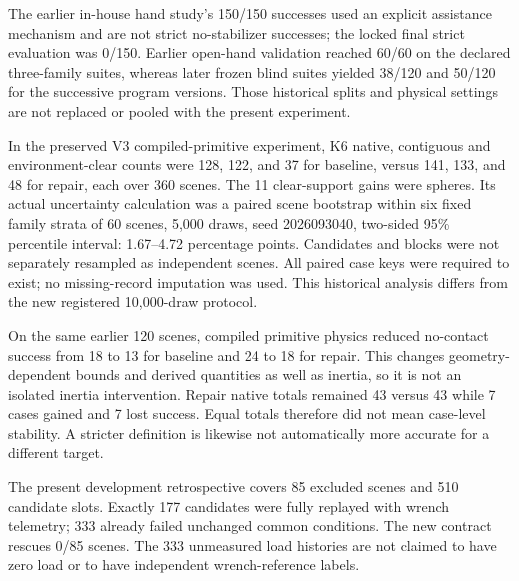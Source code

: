 The earlier in-house hand study's 150/150 successes used an explicit assistance
mechanism and are not strict no-stabilizer successes; the locked final strict
evaluation was 0/150. Earlier open-hand validation reached 60/60 on the declared
three-family suites, whereas later frozen blind suites yielded 38/120 and
50/120 for the successive program versions. Those historical splits and
physical settings are not replaced or pooled with the present experiment.

In the preserved V3 compiled-primitive experiment, K6 native, contiguous and
environment-clear counts were 128,
122, and 37
for baseline, versus 141,
133, and 48
for repair, each over 360 scenes. The 11 clear-support gains were spheres.
Its actual uncertainty calculation was a paired scene bootstrap within six
fixed family strata of 60 scenes, 5,000 draws, seed 2026093040, two-sided 95\%
percentile interval: 1.67--4.72 percentage points. Candidates and blocks
were not separately resampled as independent scenes. All paired case keys
were required to exist; no missing-record imputation was used. This historical
analysis differs from the new registered 10,000-draw protocol.

On the same earlier 120 scenes, compiled primitive physics reduced no-contact
success from 18 to 13 for baseline and 24 to 18 for repair. This changes
geometry-dependent bounds and derived quantities as well as inertia, so it is
not an isolated inertia intervention. Repair native totals remained
43 versus 43 while 7 cases gained and
7 lost success. Equal totals therefore did not mean case-level
stability. A stricter definition is likewise not automatically more accurate
for a different target.

The present development retrospective covers 85 excluded
scenes and 510 candidate slots. Exactly
177 candidates were fully replayed with wrench telemetry;
333 already failed unchanged common
conditions. The new contract rescues 0/85
scenes. The 333 unmeasured load histories are not claimed to have zero load or
to have independent wrench-reference labels.
